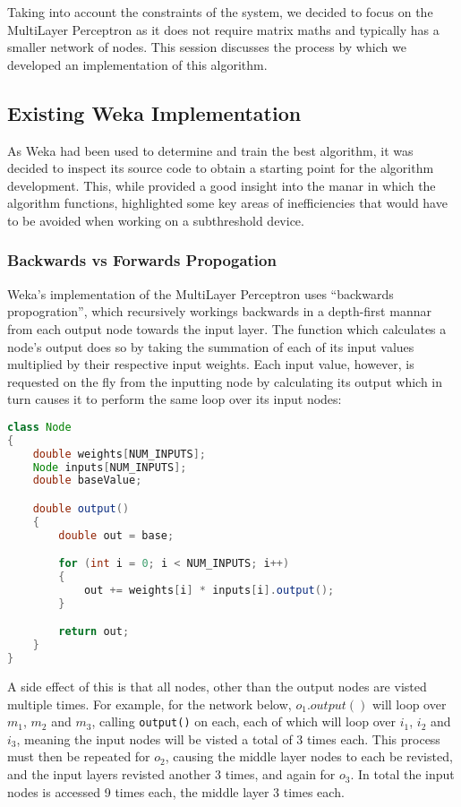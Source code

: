 
Taking into account the constraints of the system, we decided to focus on the MultiLayer Perceptron as it does not require matrix maths and typically has a smaller network of nodes. This session discusses the process by which we developed an implementation of this algorithm.

\subsection{Existing Weka Implementation}

As Weka had been used to determine and train the best algorithm, it was decided to inspect its source code to obtain a starting point for the algorithm development. This, while provided a good insight into the manar in which the algorithm functions, highlighted some key areas of inefficiencies that would have to be avoided when working on a subthreshold device.

\subsubsection{Backwards vs Forwards Propogation}

Weka's implementation of the MultiLayer Perceptron uses ``backwards propogration'', which recursively workings backwards in a depth-first mannar from each output node towards the input layer. The function which calculates a node's output does so by taking the summation of each of its input values multiplied by their respective input weights. Each input value, however, is requested on the fly from the inputting node by calculating its output which in turn causes it to perform the same loop over its input nodes:

\begin{lstlisting}[language=Java,caption={Weka's method of calculating a node's output}]
class Node
{
    double weights[NUM_INPUTS];
    Node inputs[NUM_INPUTS];
    double baseValue;

    double output()
    {
        double out = base;

        for (int i = 0; i < NUM_INPUTS; i++)
        {
            out += weights[i] * inputs[i].output();
        }

        return out;
    }
}
\end{lstlisting}

A side effect of this is that all nodes, other than the output nodes are visted multiple times. For example, for the network below, $o_1.output()$ will loop over $m_1$, $m_2$ and $m_3$, calling \verb|output()| on each, each of which will loop over $i_1$, $i_2$ and $i_3$, meaning the input nodes will be visted a total of 3 times each. This process must then be repeated for $o_2$, causing the middle layer nodes to each be revisted, and the input layers revisted another 3 times, and again for $o_3$. In total the input nodes is accessed 9 times each, the middle layer 3 times each.

